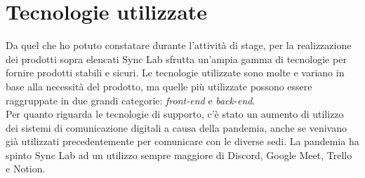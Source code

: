 
\section{Tecnologie utilizzate}
\label{sec:tecnologie-utilizzate}

Da quel che ho potuto constatare durante l'attività di stage, per la realizzazione dei prodotti sopra elencati Sync Lab sfrutta un'ampia gamma di tecnologie per fornire prodotti stabili e sicuri. Le tecnologie utilizzate sono molte e variano in base alla necessità del prodotto, ma quelle più utilizzate possono essere raggruppate in due grandi categorie: \textit{front-end} e \textit{back-end}. \\

Per quanto riguarda le tecnologie di supporto, c'è stato un aumento di utilizzo dei sistemi di comunicazione digitali a causa della pandemia, anche se venivano già utilizzati precedentemente per comunicare con le diverse sedi. La pandemia ha spinto Sync Lab ad un utilizzo sempre maggiore di Discord, Google Meet, Trello e Notion.


